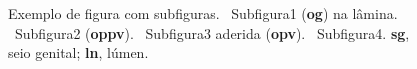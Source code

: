 \begin{figure}[htbp]
    \caption[Figura com subfiguras]{Exemplo de figura com subfiguras. ~Subfigura1 (\textbf{og}) na lâmina. ~Subfigura2 (\textbf{oppv}). ~Subfigura3 aderida (\textbf{opv}). ~Subfigura4. \textbf{sg}, seio genital; \textbf{ln}, lúmen.}%
    \label{fig:fsm}
\end{figure}
